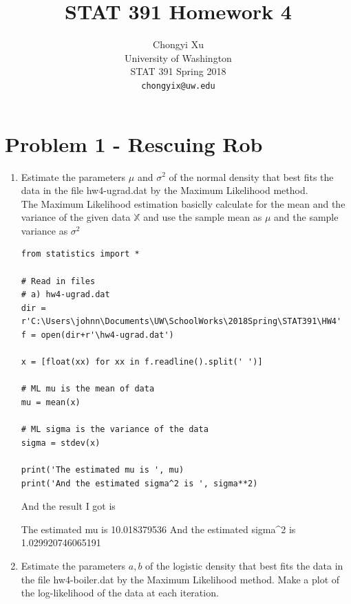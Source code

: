 \documentclass[preprint,12pt]{elsarticle}
\begin{document}
    \title{\LARGE \bf
        STAT 391 Homework 4
        }
        
        \author{ \parbox{3 in}{\centering Chongyi Xu \\
                 University of Washington\\
                 STAT 391 Spring 2018\\
                 {\tt\small chongyix@uw.edu}}
        }
    \maketitle

    \section{Problem 1 - Rescuing Rob}
    \begin{enumerate}
        \item Estimate the parameters $\mu$ and $\sigma^2$ of the 
        normal density that best fits the data in the file hw4-ugrad.dat
        by the Maximum Likelihood method.\\

        The Maximum Likelihood estimation basiclly calculate for 
        the mean and the variance of the given data $\mathbb{X}$ and 
        use the sample mean as $\mu$ and the sample variance as $\sigma^2$

        \begin{lstlisting}
from statistics import *

# Read in files
# a) hw4-ugrad.dat
dir = r'C:\Users\johnn\Documents\UW\SchoolWorks\2018Spring\STAT391\HW4'
f = open(dir+r'\hw4-ugrad.dat')

x = [float(xx) for xx in f.readline().split(' ')]

# ML mu is the mean of data
mu = mean(x)

# ML sigma is the variance of the data
sigma = stdev(x)

print('The estimated mu is ', mu)
print('And the estimated sigma^2 is ', sigma**2)
        \end{lstlisting}

        And the result I got is 
        \begin{spverbatim}
The estimated mu is  10.018379536
And the estimated sigma^2 is  1.029920746065191
        \end{spverbatim}

        \item Estimate the parameters $a,b$ of the logistic density
        that best fits the data in the file hw4-boiler.dat by the
        Maximum Likelihood method. Make a plot of the log-likelihood
        of the data at each iteration.\\


\end{enumerate}
\end{document}
